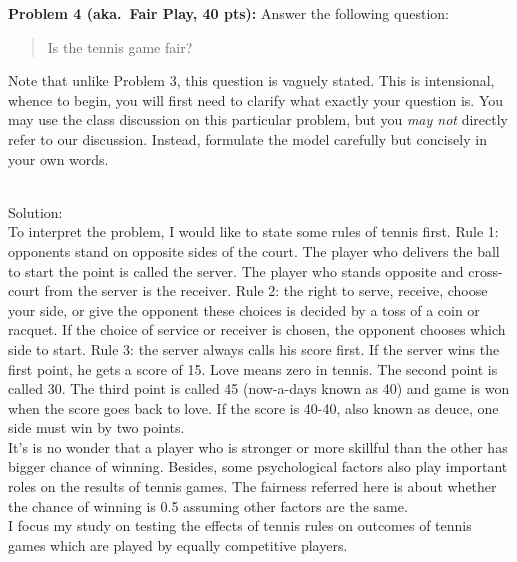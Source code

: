 \documentclass[12pt]{article}
\begin{document}
\newpage
\vskip0.25in
\noindent\textbf{Problem 4 (aka.\ Fair Play, 40 pts):}
Answer the following question:
\begin{verse}
Is the tennis game fair?
\end{verse}
Note that unlike Problem 3, this question is vaguely stated.
This is intensional, whence to begin, you will first need to clarify
what exactly your question is.
You may use the class discussion on this particular 
problem, but you \emph{may not} directly refer to our 
discussion.  Instead, formulate the model carefully but concisely in 
your own words.   

\noindent\ \\Solution:\\
To interpret the problem, I would like to state some rules of tennis first. Rule 1: opponents stand on opposite sides of the court. The player who delivers the ball to start the point is called the server. The player who stands opposite and cross-court from the server is the receiver. Rule 2: the right to serve, receive, choose your side, or give the opponent these choices is decided by a toss of a coin or racquet. If the choice of service or receiver is chosen, the opponent chooses which side to start. Rule 3: the server always calls his score first. If the server wins the first point, he gets a score of 15. Love means zero in tennis. The second point is called 30. The third point is called 45 (now-a-days known as 40) and game is won when the score goes back to love. If the score is 40-40, also known as deuce, one side must win by two points. 
\\
It's is no wonder that a player who is stronger or more skillful than the other has bigger chance of winning. Besides, some psychological factors also play important roles on the results of tennis games. The fairness referred here is about whether the chance of winning is 0.5 assuming other factors are the same. \\
I focus my study on testing the effects of tennis rules on outcomes of tennis games which are played by equally competitive players.\\
\end{document}
